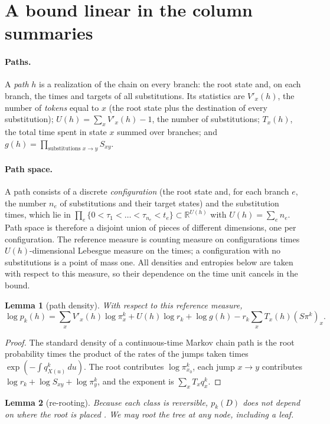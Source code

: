 \documentclass[11pt]{article}
\newtheorem{lemma}{Lemma}
\begin{document}
\section{A bound linear in the column summaries}
\label{sec:bound}

\paragraph{Paths.} A \emph{path} $h$ is a realization of the chain on every
branch: the root state and, on each branch, the times and targets of all
substitutions. Its statistics are $V'_x(h)$, the number of \emph{tokens} equal
to $x$ (the root state plus the destination of every substitution);
$U(h)=\sum_xV'_x(h)-1$, the number of substitutions; $T_x(h)$, the total time
spent in state $x$ summed over branches; and
$g(h)=\prod_{\text{substitutions }x\to y}S_{xy}$.

\paragraph{Path space.} A path consists of a discrete \emph{configuration}
(the root state and, for each branch $e$, the number $n_e$ of substitutions and
their target states) and the substitution times, which lie in
$\prod_e\{0<\tau_1<\dots<\tau_{n_e}<t_e\}\subset\mathbb R^{U(h)}$ with
$U(h)=\sum_en_e$. Path space is therefore a disjoint union of pieces of
different dimensions, one per configuration. The reference measure is counting
measure on configurations times $U(h)$-dimensional Lebesgue measure on the
times; a configuration with no substitutions is a point of mass one. All
densities and entropies below are taken with respect to this measure, so their
dependence on the time unit cancels in the bound.

\begin{lemma}[path density]\label{lem:density}
With respect to this reference measure,
\[
\log p_k(h)=\sum_xV'_x(h)\log\pi^k_x+U(h)\log r_k+\log g(h)
 -r_k\sum_xT_x(h)(S\pi^k)_x .
\]
\end{lemma}
\begin{proof}
The standard density of a continuous-time Markov chain path is the root
probability times the product of the rates of the jumps taken times
$\exp(-\int q^k_{X(u)}\,du)$. The root contributes $\log\pi^k_{x_0}$, each jump
$x\to y$ contributes $\log r_k+\log S_{xy}+\log\pi^k_y$, and the exponent is
$\sum_xT_xq^k_x$.
\end{proof}

\begin{lemma}[re-rooting]\label{lem:reroot}
Because each class is reversible, $p_k(D)$ does not depend on where the root
is placed \citep{Felsenstein81}. We may root the tree at any node, including a
leaf.
\end{lemma}
\end{document}
